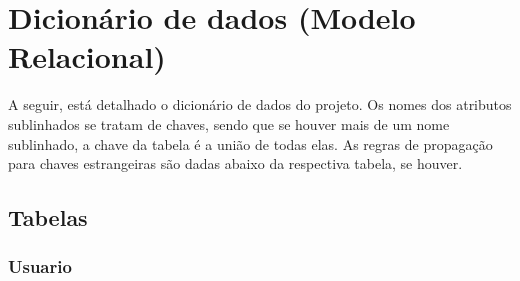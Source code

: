 \section{Dicionário de dados (Modelo Relacional)}

\vspace{5mm}

A seguir, está detalhado o dicionário de dados do projeto. Os nomes dos atributos sublinhados se tratam de chaves, sendo que se houver mais de um nome sublinhado, a chave da tabela é a união de todas elas. As regras de propagação para chaves estrangeiras são dadas abaixo da respectiva tabela, se houver. 


\subsection{Tabelas}
\vspace{3mm}

\subsubsection{Usuario}

